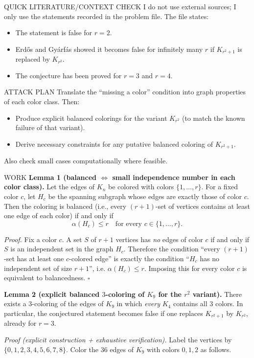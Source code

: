 QUICK LITERATURE/CONTEXT CHECK
I do not use external sources; I only use the statements recorded in the problem
file.
The file states:
\begin{itemize}
\item The statement is false for $r=2$.
\item Erd\H{o}s and Gy\'arf\'as showed it becomes false for infinitely many $r$ if
$K_{r^2+1}$ is replaced by $K_{r^2}$.
\item The conjecture has been proved for $r=3$ and $r=4$.
\end{itemize}

ATTACK PLAN
Translate the ``missing a color'' condition into graph properties of each color
class.
Then:
\begin{itemize}
\item Produce explicit balanced colorings for the variant $K_{r^2}$ (to match the
known failure of that variant).
\item Derive necessary constraints for any putative balanced coloring of
$K_{r^2+1}$.
\end{itemize}
Also check small cases computationally where feasible.

WORK
\textbf{Lemma 1 (balanced $\Leftrightarrow$ small independence number in each color class).}
Let the edges of $K_n$ be colored with colors $\{1,\dots,r\}$.
For a fixed color $c$, let $H_c$ be the spanning subgraph whose edges are exactly
those of color $c$.
Then the coloring is balanced (i.e., every $(r+1)$-set of vertices contains at
least one edge of each color) if and only if
\[
\alpha(H_c)\le r\quad\text{for every }c\in\{1,\dots,r\}.
\]

\emph{Proof.}
Fix a color $c$.
A set $S$ of $r+1$ vertices has \emph{no} edges of color $c$ if and only if $S$ is
an independent set in the graph $H_c$.
Therefore the condition ``every $(r+1)$-set has at least one $c$-colored edge'' is
exactly the condition ``$H_c$ has no independent set of size $r+1$'', i.e.
$\alpha(H_c)\le r$.
Imposing this for every color $c$ is equivalent to balancedness.
\hfill $\square$

\medskip
\textbf{Lemma 2 (explicit balanced $3$-coloring of $K_9$ for the $r^2$ variant).}
There exists a $3$-coloring of the edges of $K_9$ in which \emph{every} $K_4$
contains all $3$ colors.
In particular, the conjectured statement becomes false if one replaces
$K_{r^2+1}$ by $K_{r^2}$, already for $r=3$.

\emph{Proof (explicit construction + exhaustive verification).}
Label the vertices by $\{0,1,2,3,4,5,6,7,8\}$.
Color the $36$ edges of $K_9$ with colors $0,1,2$ as follows.

